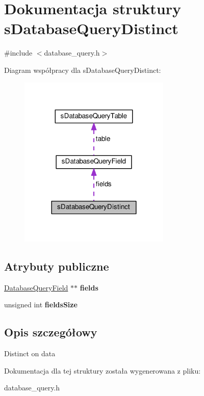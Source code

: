 \hypertarget{structsDatabaseQueryDistinct}{}\section{Dokumentacja struktury s\+Database\+Query\+Distinct}
\label{structsDatabaseQueryDistinct}


{\ttfamily \#include $<$database\+\_\+query.\+h$>$}



Diagram współpracy dla s\+Database\+Query\+Distinct\+:\nopagebreak
\begin{figure}[H]
\begin{center}
\leavevmode
\includegraphics[width=204pt]{structsDatabaseQueryDistinct__coll__graph}
\end{center}
\end{figure}
\subsection*{Atrybuty publiczne}
\begin{DoxyCompactItemize}
\item 
\hyperlink{structsDatabaseQueryField}{Database\+Query\+Field} $\ast$$\ast$ {\bfseries fields}\hypertarget{structsDatabaseQueryDistinct_a78ff1f92d133772c3c310dec754cfa60}{}\label{structsDatabaseQueryDistinct_a78ff1f92d133772c3c310dec754cfa60}

\item 
unsigned int {\bfseries fields\+Size}\hypertarget{structsDatabaseQueryDistinct_adefbf680f57431d687f31f2f1a0ba04b}{}\label{structsDatabaseQueryDistinct_adefbf680f57431d687f31f2f1a0ba04b}

\end{DoxyCompactItemize}


\subsection{Opis szczegółowy}
Distinct on data 

Dokumentacja dla tej struktury została wygenerowana z pliku\+:\begin{DoxyCompactItemize}
\item 
database\+\_\+query.\+h\end{DoxyCompactItemize}
